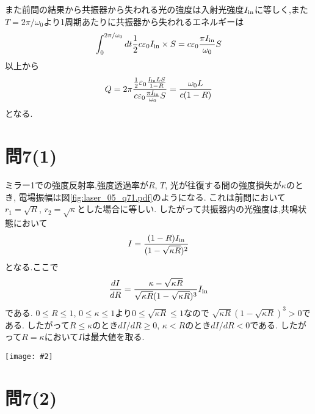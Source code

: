 \documentclass[uplatex,a4j,11pt,dvipdfmx]{jsarticle}
\makeatletter
\def\fgcaption{\def\@captype{figure}\caption}
\newcommand{\mfig}[3][width=15cm]{
\begin{center}
\texttt{[image: \#2]}
\fgcaption{#3 \label{fig:#2}}
\end{center}
}
\makeatother
\begin{document}
また前問の結果から共振器から失われる光の強度は入射光強度$I_{\rm in}$に等しく,また$T=2\pi/\omega_0$より1周期あたりに共振器から失われるエネルギーは
\begin{align}
  \int^{2\pi/\omega_0}_0dt\frac{1}{2}c\varepsilon_0I_{\rm in}\times S=c\varepsilon_0\frac{\pi I_{\rm in}}{\omega_0}S
\end{align}
以上から
\begin{align}
  Q=2\pi\frac{\frac{1}{2}\varepsilon_0\frac{I_{\rm in}LS}{1-R}}{c\varepsilon_0\frac{\pi I_{\rm in}}{\omega_0}S}=\frac{\omega_0 L}{c(1-R)}
\end{align}
となる.
\section*{問7(1)}
ミラー1での強度反射率,強度透過率が$R$, $T$, 光が往復する間の強度損失が$\kappa$のとき,
電場振幅は図\ref{fig:laser_05_q71.pdf}のようになる.
これは前問において$r_1=\sqrt{R}$, $r_2=\sqrt{\kappa}$とした場合に等しい.
したがって共振器内の光強度は,共鳴状態において
\begin{align}
  I=\frac{(1-R)I_{\rm in}}{(1-\sqrt{\kappa R})^2}
\end{align}
となる.ここで
\begin{align}
  \frac{dI}{dR}=\frac{\kappa-\sqrt{\kappa R}}{\sqrt{\kappa R}(1-\sqrt{\kappa R})^3}I_{\rm in}
\end{align}
である. $0\leq R\leq 1$, $0\leq \kappa\leq 1$より$0\leq\sqrt{\kappa R}\leq 1$なので
$\sqrt{\kappa R}(1-\sqrt{\kappa R})^3>0$である.
したがって$R\leq\kappa$のとき$dI/dR\geq0$, $\kappa<R$のとき$dI/dR<0$である.
したがって$R=\kappa$において$I$は最大値を取る.
\mfig[width=8cm]{laser_05_q71.pdf}{損失$\kappa$のときの電場}
\section*{問7(2)}
\end{document}
